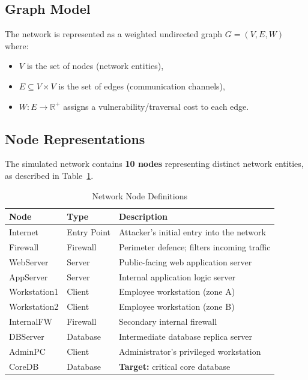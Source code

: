 \documentclass[12pt,a4paper]{article}
\begin{document}
\subsection{Graph Model}

The network is represented as a weighted undirected graph $G = (V, E, W)$ where:
\begin{itemize}
    \item $V$ is the set of nodes (network entities),
    \item $E \subseteq V \times V$ is the set of edges (communication channels),
    \item $W: E \rightarrow \mathbb{R}^{+}$ assigns a vulnerability/traversal cost to each edge.
\end{itemize}

\subsection{Node Representations}

The simulated network contains \textbf{10 nodes} representing distinct network entities,
as described in Table~\ref{tab:nodes}.

\begin{table}[H]
    \centering
    \caption{Network Node Definitions}
    \label{tab:nodes}
    \begin{tabular}{llp{7cm}}
        \toprule
        \textbf{Node} & \textbf{Type} & \textbf{Description} \\
        \midrule
        Internet      & Entry Point  & Attacker's initial entry into the network \\
        Firewall      & Firewall     & Perimeter defence; filters incoming traffic \\
        WebServer     & Server       & Public-facing web application server \\
        AppServer     & Server       & Internal application logic server \\
        Workstation1  & Client       & Employee workstation (zone A) \\
        Workstation2  & Client       & Employee workstation (zone B) \\
        InternalFW    & Firewall     & Secondary internal firewall \\
        DBServer      & Database     & Intermediate database replica server \\
        AdminPC       & Client       & Administrator's privileged workstation \\
        CoreDB        & Database     & \textbf{Target:} critical core database \\
        \bottomrule
    \end{tabular}
\end{table}
\end{document}
